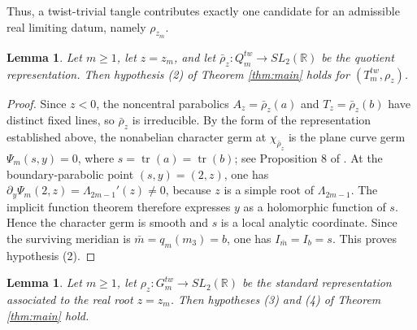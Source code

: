 \documentclass{article}
\DeclareMathOperator{\tr}{tr}
\theoremstyle{plain}
\theoremstyle{definition}
\theoremstyle{plain}
\theoremstyle{plain}
\theoremstyle{plain}
\newtheorem{lemma}[theorem]{Lemma}
\theoremstyle{remark}
\theoremstyle{remark}
\theoremstyle{plain}
\theoremstyle{plain}
\newcounter{main}
\theoremstyle{plain}
\theoremstyle{plain}
\begin{document}
Thus, a twist-trivial tangle contributes exactly one candidate for an admissible real limiting datum, namely $\rho_{z_m}$. 

\begin{lemma}\label{lma:twist2}
Let $m \geq 1$, let $z = z_m$, and let $\bar\rho_z: Q_m^{tw} \to SL_2(\mathbb R)$ be the quotient representation. Then hypothesis (2) of Theorem \ref{thm:main} holds for $(T_m^{tw}, \rho_z)$.
\end{lemma}

\begin{proof}
Since $z < 0$, the noncentral parabolics $A_z = \bar\rho_z(a)$ and $T_z = \bar\rho_z(b)$ have distinct fixed lines, so $\bar\rho_z$ is irreducible. By the form of the representation established above, the nonabelian character germ at $\chi_{\bar\rho_z}$ is the plane curve germ $\Psi_m(s, y) = 0$, where $s = \tr(a) = \tr(b)$; see Proposition 8 of \cite{twist}. At the boundary-parabolic point $(s, y) = (2, z)$, one has $\partial_y\Psi_m(2,z) = \Lambda_{2m-1}'(z) \neq 0$, because $z$ is a simple root of $\Lambda_{2m-1}$. The implicit function theorem therefore expresses $y$ as a holomorphic function of $s$. Hence the character germ is smooth and $s$ is a local analytic coordinate. Since the surviving meridian is $\bar m = q_m(m_3) = b$, one has $I_{\bar m} = I_b = s$. This proves hypothesis (2).
\end{proof}

\begin{lemma}\label{lma:twist34}
Let $m \geq 1$, let $\rho_z: G_m^{tw} \to SL_2(\mathbb{R})$ be the standard representation associated to the real root $z = z_m$. Then hypotheses (3) and (4) of Theorem \ref{thm:main} hold. 
\end{lemma}
\end{document}

